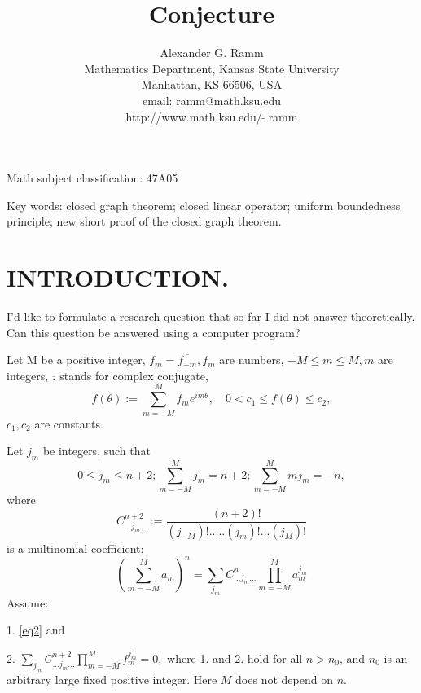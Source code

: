 \documentclass[12pt]{article}
\theoremstyle{plain}
\numberwithin{equation}{section}
\def\be{\begin{equation}}
\def\ee{\end{equation}}
\begin{document}
\title{Conjecture}

\author{Alexander G. Ramm \\
Mathematics Department, Kansas State University\\
Manhattan, KS 66506, USA\\
email:     ramm@math.ksu.edu\\
http://www.math.ksu.edu/\,$\widetilde{\ }$\,ramm}

\date{}

\maketitle\thispagestyle{empty}

\begin{abstract}

\end{abstract}


 Math subject classification: 47A05

Key words: closed graph theorem; closed linear operator; uniform boundedness principle; new short proof of the closed graph theorem.


\section{INTRODUCTION.}\label{S:1}

I'd like to formulate a research question that so far I did not answer theoretically.
Can this question be answered using a computer program?

Let M be a positive integer, $f_m=\overline{f_{-m}}, f_m$ are numbers, $-M \le m \le M, m$ are integers, $\overline{.}$ stands for complex conjugate,
\be 
 f(\theta):= \sum_{m=-M}^M f_m e^{im\theta}, \quad 0<c_1\le f(\theta)\le c_2,  
\ee
$c_1, c_2$ are constants.

Let $j_m$ be integers, such that
\be \label{eq2}
	0\le j_m\le n+2;     \sum_{m=-M}^M j_m=n+2;     \sum_{m=-M}^M mj_m=-n,       
\ee
where
\be
	C^{n+2}_{...j_m...}:=\frac {(n+2)!}{(j_{-M})!.....(j_m)!...(j_M)!}
\ee
is a multinomial coefficient:  
\be
	(\sum_{m=-M}^M a_m)^n=\sum_{j_m}C^{n}_{...j_m...}\prod_{m=-M}^M a_m^{j_m}
\ee	
Assume:

1. \eqref{eq2}
and

2.  $\sum_{j_m}C^{n+2}_{...j_m...}\prod_{m=-M}^M f_m^{j_m}=0,$
where 1. and 2. hold for all $n>n_0$, and $n_0$ is an arbitrary large fixed positive integer.
Here $M$ does not depend on $n$.
\end{document}
